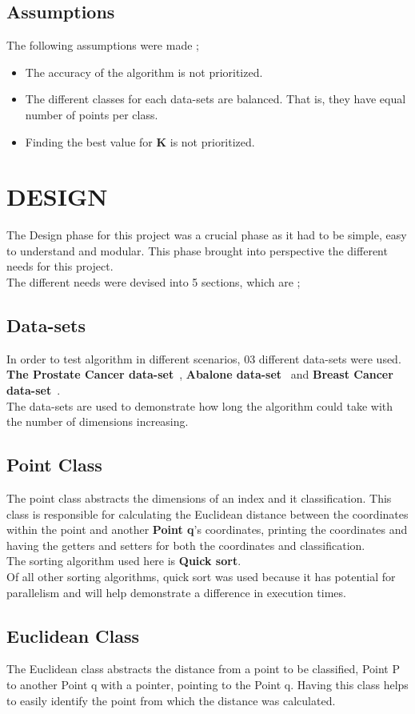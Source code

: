 \documentclass[conference]{IEEEtran}
\begin{document}
\subsection{ Assumptions }
The following assumptions were made ; 
\begin{itemize}
    \item The accuracy of the algorithm is not prioritized. 
    \item The different classes for each data-sets are balanced. That is, they have equal number of points per class. 
    \item Finding the best value for \textbf{K} is not prioritized. 
\end{itemize}
\section{DESIGN}
The Design phase for this project was a crucial phase as it had to be simple, easy to understand and modular. This phase brought into perspective the different needs for this project. \\
The different needs were devised into 5 sections, which are ;
\subsection{ Data-sets }
In order to test algorithm in different scenarios, 03 different data-sets were used.  \textbf{The Prostate Cancer data-set}~\cite{pcd}, \textbf{Abalone data-set}~\cite{ad} and \textbf{Breast Cancer data-set}~\cite{bcd}.\\ 
The data-sets are used to  demonstrate how long the algorithm could take with the number of dimensions increasing.  
\subsection{ Point Class }
The point class abstracts the dimensions of an index and it classification. This class is responsible for calculating the Euclidean distance between the coordinates within the point and another \textbf{Point q}'s coordinates, printing the coordinates and having the getters and setters for both the coordinates and classification. \\ 
The sorting algorithm used here is \textbf{Quick sort}. \\
Of all other sorting algorithms, quick sort was used because it has potential for parallelism and will help demonstrate a difference in execution times. 
\subsection{ Euclidean Class }
The Euclidean class abstracts the distance from a point to be classified, Point P to another Point q with a pointer, pointing to the Point q. Having this class helps to easily identify the point from which the distance was calculated.
\end{document}

